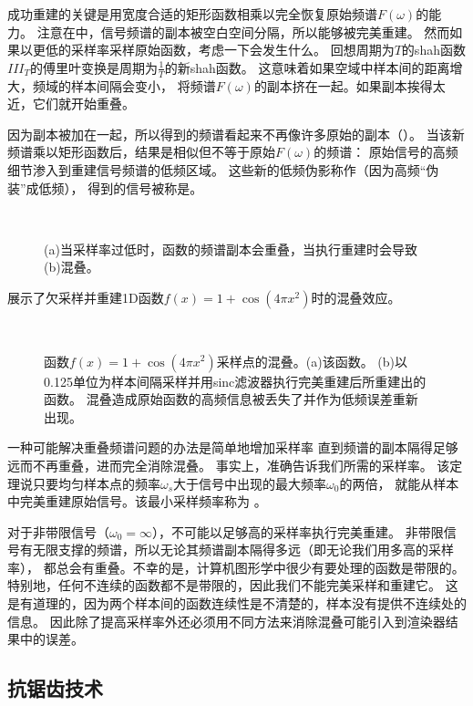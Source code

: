 成功重建的关键是用宽度合适的矩形函数相乘以完全恢复原始频谱$F(\omega)$的能力。
注意在中，信号频谱的副本被空白空间分隔，所以能够被完美重建。
然而如果以更低的采样率采样原始函数，考虑一下会发生什么。
回想周期为$T$的shah函数$III_T$的傅里叶变换是周期为$\displaystyle\frac{1}{T}$的新shah函数。
这意味着如果空域中样本间的距离增大，频域的样本间隔会变小，
将频谱$F(\omega)$的副本挤在一起。如果副本挨得太近，它们就开始重叠。

因为副本被加在一起，所以得到的频谱看起来不再像许多原始的副本（）。
当该新频谱乘以矩形函数后，结果是相似但不等于原始$F(\omega)$的频谱：
原始信号的高频细节渗入到重建信号频谱的低频区域。
这些新的低频伪影称作（因为高频“伪装”成低频），
得到的信号被称是。
\begin{figure}
    \centering
    \,
    \caption{(a)当采样率过低时，函数的频谱副本会重叠，当执行重建时会导致(b)混叠。}
    \label{fig:7.8}
\end{figure}

展示了欠采样并重建1D函数$f(x)=1+\cos(4\pi x^2)$时的混叠效应。
\begin{figure}[htbp]
    \centering
    \,
    \caption{函数$f(x)=1+\cos(4\pi x^2)$采样点的混叠。(a)该函数。
        (b)以0.125单位为样本间隔采样并用sinc滤波器执行完美重建后所重建出的函数。
        混叠造成原始函数的高频信息被丢失了并作为低频误差重新出现。}
    \label{fig:7.9}
\end{figure}

一种可能解决重叠频谱问题的办法是简单地增加采样率
直到频谱的副本隔得足够远而不再重叠，进而完全消除混叠。
事实上，准确告诉我们所需的采样率。
该定理说只要均匀样本点的频率$\omega_s$大于信号中出现的最大频率$\omega_0$的两倍，
就能从样本中完美重建原始信号。该最小采样频率称为
。

对于非带限信号（$\omega_0=\infty$），不可能以足够高的采样率执行完美重建。
非带限信号有无限支撑的频谱，所以无论其频谱副本隔得多远（即无论我们用多高的采样率），
都总会有重叠。不幸的是，计算机图形学中很少有要处理的函数是带限的。
特别地，任何不连续的函数都不是带限的，因此我们不能完美采样和重建它。
这是有道理的，因为两个样本间的函数连续性是不清楚的，样本没有提供不连续处的信息。
因此除了提高采样率外还必须用不同方法来消除混叠可能引入到渲染器结果中的误差。

\subsection{抗锯齿技术}\label{sub:抗锯齿技术}
